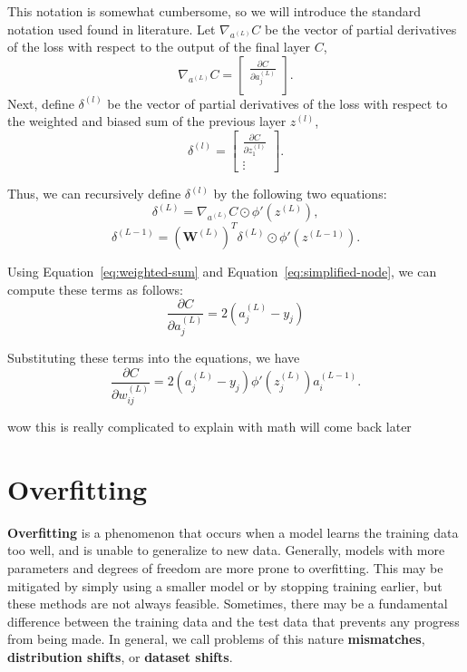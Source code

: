\documentclass[12pt]{report}
\theoremstyle{definition}
\theoremstyle{remark}
\begin{document}
This notation is somewhat cumbersome, so we will introduce the standard notation used found in literature. Let $\nabla_{a^{(L)}}C$ be the vector of partial derivatives of the loss with respect to the output of the final layer $C$,
\begin{equation}
    \nabla_{a^{(L)}}C = \begin{bmatrix}
        \frac{\partial C}{\partial a_j^{(L)}} \\
    \end{bmatrix}.
\end{equation}
Next, define $\delta^{(l)}$ be the vector of partial derivatives of the loss with respect to the weighted and biased sum of the previous layer $z^{(l)}$,
\begin{equation}
    \delta^{(l)} = \begin{bmatrix}
        \frac{\partial C}{\partial z_1^{(l)}} \\
        \vdots
    \end{bmatrix}.
\end{equation}


Thus, we can recursively define $\delta^{(l)}$ by the following two equations:
\begin{equation}
    \delta^{(L)} = \nabla_{a^{(L)}}C \odot \phi'(z^{(L)}),
\end{equation}
\begin{equation}
    \delta^{(L-1)} = {\left(\mathbf{W}^{(L)}\right)}^T \delta^{(L)} \odot \phi'(z^{(L-1)}).
\end{equation}

Using Equation~\ref{eq:weighted-sum} and Equation~\ref{eq:simplified-node}, we can compute these terms as follows:
\begin{equation}
    \frac{\partial C}{\partial a_j^{(L)}} = 2(a_j^{(L)} - y_j)
\end{equation}

Substituting these terms into the equations, we have
\begin{equation}
    \frac{\partial C}{\partial w_{ij}^{(L)}} = 2(a_j^{(L)} - y_j) \phi'(z_j^{(L)}) a_i^{(L-1)}.
\end{equation}

wow this is really complicated to explain with math will come back later

\section{Overfitting}\label{sec:overfitting}
\textbf{Overfitting} is a phenomenon that occurs when a model learns the training data too well, and is unable to generalize to new data. Generally, models with more parameters and degrees of freedom are more prone to overfitting. This may be mitigated by simply using a smaller model or by stopping training earlier, but these methods are not always feasible. Sometimes, there may be a fundamental difference between the training data and the test data that prevents any progress from being made. In general, we call problems of this nature \textbf{mismatches}, \textbf{distribution shifts}, or \textbf{dataset shifts}.
\end{document}

